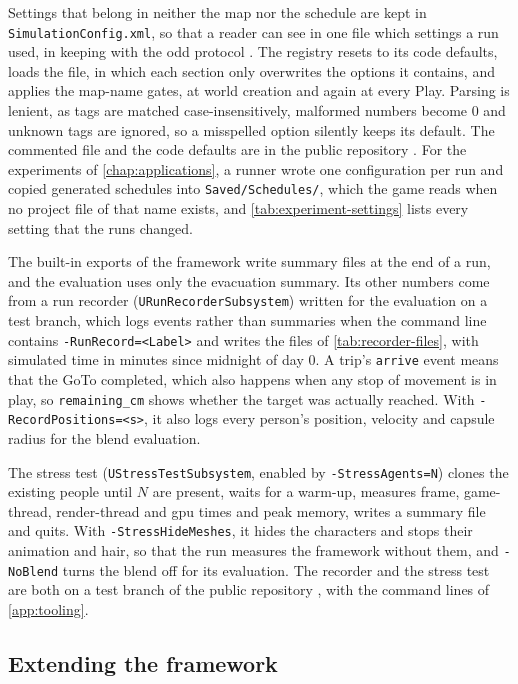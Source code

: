 Settings that belong in neither the map nor the schedule are kept in \texttt{SimulationConfig.xml}, so that a reader can see in one file which settings a run used, in keeping with the \acrshort{odd} protocol \citep{grimm2020odd}. The registry resets to its code defaults, loads the file, in which each section only overwrites the options it contains, and applies the map-name gates, at world creation and again at every Play. Parsing is lenient, as tags are matched case-insensitively, malformed numbers become 0 and unknown tags are ignored, so a misspelled option silently keeps its default. The commented file and the code defaults are in the public repository \citep{armada2026repository}. For the experiments of \cref{chap:applications}, a runner wrote one configuration per run and copied generated schedules into \texttt{Saved/Schedules/}, which the game reads when no project file of that name exists, and \cref{tab:experiment-settings} lists every setting that the runs changed.

The built-in exports of the framework write summary files at the end of a run, and the evaluation uses only the evacuation summary. Its other numbers come from a run recorder (\texttt{URunRecorderSubsystem}) written for the evaluation on a test branch, which logs events rather than summaries when the command line contains \texttt{-RunRecord=<Label>} and writes the files of \cref{tab:recorder-files}, with simulated time in minutes since midnight of day 0. A trip's \texttt{arrive} event means that the GoTo completed, which also happens when any stop of movement is in play, so \texttt{remaining\_cm} shows whether the target was actually reached. With \texttt{-RecordPositions=<s>}, it also logs every person's position, velocity and capsule radius for the blend evaluation.

The stress test (\texttt{UStressTestSubsystem}, enabled by \texttt{-StressAgents=N}) clones the existing people until $N$ are present, waits for a warm-up, measures frame, game-thread, render-thread and \gls{gpu} times and peak memory, writes a summary file and quits. With \texttt{-StressHideMeshes}, it hides the characters and stops their animation and hair, so that the run measures the framework without them, and \texttt{-NoBlend} turns the blend off for its evaluation. The recorder and the stress test are both on a test branch of the public repository \citep{armada2026repository}, with the command lines of \cref{app:tooling}.

\subsection{Extending the framework}
\label{sec:extending}

